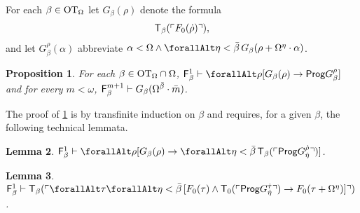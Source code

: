 \documentclass[UKenglish,cleveref,DIV=12]{scrartcl}
\let\forall\forallAlt
\newtheorem{lemma}{Lemma}
\newtheorem{proposition}[lemma]{Proposition}
\theoremstyle{definition}
\theoremstyle{definition}
\begin{document}
For each $\beta\in\mathrm{OT}_\Omega$ let $G_\beta(\rho)$ denote the formula
\begin{align*}
  \mathsf{T}_{\beta}(\ulcorner{F_0(\dot\rho)}\urcorner),
\end{align*}
and let $G_\beta^\rho(\alpha)$ abbreviate $\alpha<\Omega\land \forall\eta<\bar\beta\,G_\beta(\rho+\Omega^\eta\cdot\alpha)$.
\begin{proposition}\label{extlem:Fbetawellordering1}
 For each $\beta\in\mathrm{OT}_\Omega\cap\Omega$, $\F_{\beta}^1\proves \forall\rho[G_\beta(\rho)\rightarrow \Prog G_\beta^\rho]$ and for every $m<\omega$, $\mathsf{F}_{\beta}^{m+1}\vdash G_\beta(\Omega^{\bar\beta}\cdot\bar m)$.
\end{proposition}
The proof of \cref{extlem:Fbetawellordering1} is by transfinite induction on
$\beta$ and requires, for a given $\beta$, the following technical lemmata.
\begin{lemma}\label{extlem:Fbetatech1}
 $\F_\beta^1\proves \forall\rho[G_\beta(\rho)\rightarrow \forall\eta<\bar\beta\,\T_\beta(\gn{\Prog G_{\dot\eta}^{\dot\rho}})]$.
\end{lemma}
\begin{lemma}\label{extlem:Fbetatech2}
  $\F_\beta^1\proves \T_\beta(\gn{\forall\tau\forall\eta<\bar\beta\,[F_0(\tau)\land\T_0(\gn{\Prog G_{\dot\eta}^{\dot\tau}}) \rightarrow
  F_0(\tau+\Omega^{\eta})]})$.
\end{lemma}
\end{document}
